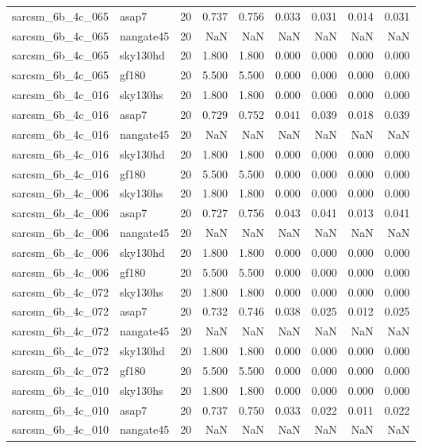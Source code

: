 \begin{tabular}{llrrrrrrr}
sarcsm\_6b\_4c\_065 & asap7 & 20 & 0.737 & 0.756 & 0.033 & 0.031 & 0.014 & 0.031 \\
sarcsm\_6b\_4c\_065 & nangate45 & 20 & NaN & NaN & NaN & NaN & NaN & NaN \\
sarcsm\_6b\_4c\_065 & sky130hd & 20 & 1.800 & 1.800 & 0.000 & 0.000 & 0.000 & 0.000 \\
sarcsm\_6b\_4c\_065 & gf180 & 20 & 5.500 & 5.500 & 0.000 & 0.000 & 0.000 & 0.000 \\
sarcsm\_6b\_4c\_016 & sky130hs & 20 & 1.800 & 1.800 & 0.000 & 0.000 & 0.000 & 0.000 \\
sarcsm\_6b\_4c\_016 & asap7 & 20 & 0.729 & 0.752 & 0.041 & 0.039 & 0.018 & 0.039 \\
sarcsm\_6b\_4c\_016 & nangate45 & 20 & NaN & NaN & NaN & NaN & NaN & NaN \\
sarcsm\_6b\_4c\_016 & sky130hd & 20 & 1.800 & 1.800 & 0.000 & 0.000 & 0.000 & 0.000 \\
sarcsm\_6b\_4c\_016 & gf180 & 20 & 5.500 & 5.500 & 0.000 & 0.000 & 0.000 & 0.000 \\
sarcsm\_6b\_4c\_006 & sky130hs & 20 & 1.800 & 1.800 & 0.000 & 0.000 & 0.000 & 0.000 \\
sarcsm\_6b\_4c\_006 & asap7 & 20 & 0.727 & 0.756 & 0.043 & 0.041 & 0.013 & 0.041 \\
sarcsm\_6b\_4c\_006 & nangate45 & 20 & NaN & NaN & NaN & NaN & NaN & NaN \\
sarcsm\_6b\_4c\_006 & sky130hd & 20 & 1.800 & 1.800 & 0.000 & 0.000 & 0.000 & 0.000 \\
sarcsm\_6b\_4c\_006 & gf180 & 20 & 5.500 & 5.500 & 0.000 & 0.000 & 0.000 & 0.000 \\
sarcsm\_6b\_4c\_072 & sky130hs & 20 & 1.800 & 1.800 & 0.000 & 0.000 & 0.000 & 0.000 \\
sarcsm\_6b\_4c\_072 & asap7 & 20 & 0.732 & 0.746 & 0.038 & 0.025 & 0.012 & 0.025 \\
sarcsm\_6b\_4c\_072 & nangate45 & 20 & NaN & NaN & NaN & NaN & NaN & NaN \\
sarcsm\_6b\_4c\_072 & sky130hd & 20 & 1.800 & 1.800 & 0.000 & 0.000 & 0.000 & 0.000 \\
sarcsm\_6b\_4c\_072 & gf180 & 20 & 5.500 & 5.500 & 0.000 & 0.000 & 0.000 & 0.000 \\
sarcsm\_6b\_4c\_010 & sky130hs & 20 & 1.800 & 1.800 & 0.000 & 0.000 & 0.000 & 0.000 \\
sarcsm\_6b\_4c\_010 & asap7 & 20 & 0.737 & 0.750 & 0.033 & 0.022 & 0.011 & 0.022 \\
sarcsm\_6b\_4c\_010 & nangate45 & 20 & NaN & NaN & NaN & NaN & NaN & NaN \\

\end{tabular}
